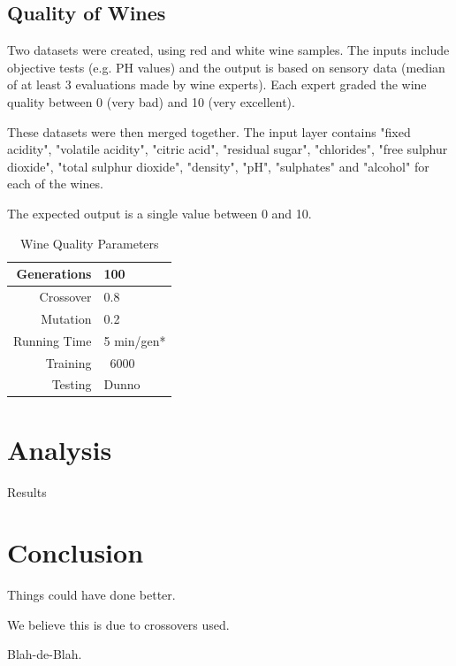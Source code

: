 \documentclass[journal]{IEEEtran}
\begin{document}
  \subsection{Quality of Wines}
  Two datasets were created, using red and white wine samples.
  The inputs include objective tests (e.g. PH values) and the output is based on sensory data
  (median of at least 3 evaluations made by wine experts). Each expert graded the wine quality 
  between 0 (very bad) and 10 (very excellent). %
  
  These datasets were then merged together. The input layer contains 
  "fixed acidity", "volatile acidity", "citric acid", "residual sugar", "chlorides", 
  "free sulphur dioxide", "total sulphur dioxide", "density", "pH", "sulphates" and "alcohol"
  for each of the wines.
  
  The expected output is a single value between 0 and 10.
  
  \begin{table}[here]
    \renewcommand{\arraystretch}{1.3}
    \caption{Wine Quality Parameters}
    \label{E2}
    \centering
    \begin{tabular}{r||l}
      \hline
      Generations & 100  \\ \hline
      Crossover   & 0.8 \\ \hline
      Mutation    & 0.2 \\ \hline
      Running Time & 5 min/gen* \\ \hline
      Training    & ~6000 \\ \hline
      Testing     & Dunno \\ \hline
    \end{tabular}
   \end{table}
  
\section{Analysis}
Results

\section{Conclusion}
Things could have done better.

We believe this is due to crossovers used.

Blah-de-Blah.


\end{document}
